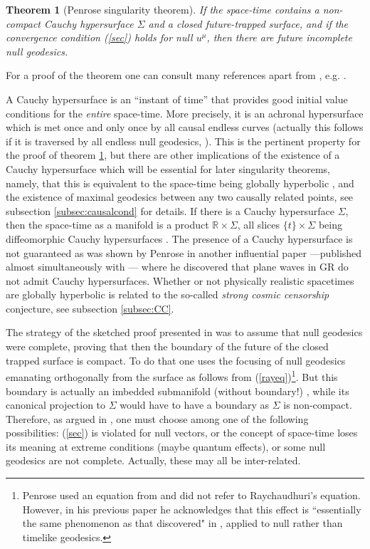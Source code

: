 \documentclass[12pt]{iopart}
\newtheorem{theorem}{Theorem}
\begin{document}
\begin{theorem}[Penrose singularity theorem]\label{th:P}
If the space-time contains a non-compact Cauchy hypersurface $\Sigma$ and a closed future-trapped surface, and if the convergence condition (\ref{sec}) holds for null $u^\mu$, then there are future incomplete null geodesics.
\end{theorem}

For a proof of the theorem one can consult many references apart from \cite{P}, e.g. \cite{HE,P5,S1,Kri,BE,O,Wald}. 

A Cauchy hypersurface \cite{HE,Ge3,P5,Wald} is an ``instant of time'' that provides good initial value conditions for the {\em entire} space-time. More precisely, it is an achronal hypersurface which is met once and only once by all causal endless curves (actually this follows if it is traversed by all endless null geodesics, \cite{Ge3}). This is the pertinent property for the proof of theorem \ref{th:P}, but there are other implications of the existence of a Cauchy hypersurface which will be essential for later singularity theorems, namely, that this is equivalent to the space-time being globally hyperbolic \cite{Le}, and the existence of maximal geodesics between any two causally related points, see subsection \ref{subsec:causalcond} for details. If there is a Cauchy hypersurface $\Sigma$, then the space-time as a manifold is a product $\mathbb{R}\times \Sigma$, all slices $\{t\}\times \Sigma$ being diffeomorphic Cauchy hypersurfaces \cite{Ge3,Se,BS}. The presence of a Cauchy hypersurface is not guaranteed as was shown by Penrose in another influential paper \cite{P2} ---published almost simultaneously with \cite{P}--- where he discovered that plane waves in GR do not admit Cauchy hypersurfaces. Whether or not physically realistic spacetimes are globally hyperbolic is related to the so-called {\em strong cosmic censorship} conjecture, see subsection \ref{subsec:CC}.

The strategy of the sketched proof presented in \cite{P} was to assume that null geodesics were complete, proving that then the boundary of the future of the closed trapped surface is compact. To do that one uses the focusing of null geodesics emanating orthogonally from the surface as follows from (\ref{rayeq})\footnote{Penrose used an equation from \cite{NP} and did not refer to Raychaudhuri's equation. However, in his previous paper \cite{P2} he acknowledges that this effect is ``essentially the same phenomenon as that discovered" in \cite{Ray,K}, applied to null rather than timelike geodesics.}. But this boundary is actually an imbedded submanifold (without boundary!) \cite{HE,P5}, while its canonical projection to $\Sigma$ would have to have a boundary as $\Sigma$ is non-compact. Therefore, as argued in \cite{P}, one must choose among one of the following possibilities: (\ref{sec}) is violated for null vectors, or the concept of space-time loses its meaning at extreme conditions (maybe quantum effects), or some null geodesics are not complete. Actually, these may all be inter-related.
\end{document}
